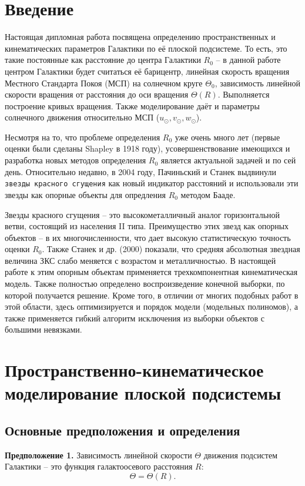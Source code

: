 \documentclass{matmex-diploma-custom}
\begin{document}
\section*{Введение}
Настоящая дипломная работа посвящена определению пространственных и кинематических параметров Галактики по её плоской подсистеме. То есть, это такие постоянные как расстояние до центра Галактики $R_0$ -- в данной работе центром Галактики будет считаться её барицентр, линейная скорость вращения Местного Стандарта Покоя (МСП) на солнечном круге $\Theta_0$, зависимость линейной скорости вращения от расстояния до оси вращения $\Theta(R)$. Выполняется построение кривых вращения. Также моделирование даёт и параметры солнечного движения относительно МСП ($u_{\odot}, v_{\odot}, w_{\odot}$).
\par Несмотря на то, что проблеме определения $R_0$ уже очень много лет (первые оценки были сделаны Shapley в 1918 году), усовершенствование имеющихся и разработка новых методов определения $R_0$ является актуальной задачей и по сей день. Относительно недавно, в 2004 году, Пачиньский и Станек выдвинули \texttt{звезды красного сгущения} как новый индикатор расстояний и использовали эти звезды как опорные объекты для опредления $R_0$ методом Бааде.
\par Звезды красного сгущения -- это высокометалличный аналог горизонтальной ветви, состоящий из населения II типа. Преимущество этих звезд как опорных объектов -- в их многочисленности, что дает высокую статистическую точность оценки $R_0$. Также Станек и др. (2000) показали, что средняя абсолютная звездная величина ЗКС слабо меняется с возрастом и металличностью. В настоящей работе к этим опорным объектам применяется трехкомпонентная кинематическая модель. Также полностью определено воспроизведение конечной выборки, по которой получается решение. Кроме того, в отличии от многих подобных работ в этой области, здесь оптимизируется и порядок модели (модельных полиномов), а также применяется гибкий алгоритм исключения из выборки объектов с большими невязками.

\section{Пространственно-кинематическое моделирование плоской подсистемы}

\subsection{Основные предположения и определения}
\textbf{Предположение 1.}
Зависимость линейной скорости $\Theta$ движения подсистем Галактики -- это функция галактоосевого расстояния $R$: 
\begin{equation}
        \Theta = \Theta(R).
\end{equation}
\end{document}
